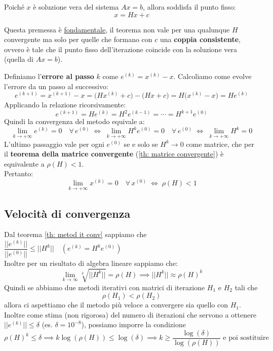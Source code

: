 \documentclass[12pt,a4paper,]{report}
\begin{document}
\begin{dimostrazione}
Poiché $x$ è soluzione vera del sistema $Ax=b$, allora soddisfa il punto fisso: 
\[
x = Hx + c
\]
\begin{nota}
    Questa premessa è \uline{fondamentale}, il teorema non vale per una qualunque $H$ convergente ma solo per quelle che formano con $c$ una \textbf{coppia consistente}, ovvero è tale che il punto fisso dell'iterazione coincide con la soluzione vera (quella di $Ax=b$).
\end{nota}
\noindent
Definiamo l'\textbf{errore al passo} $k$ come $e^{(k)} = x^{(k)} - x$.
Calcoliamo come evolve l'errore da un passo al successivo:
\[
    e^{(k+1)}
    = x^{(k+1)} - x
    = \bigl(Hx^{(k)} + c\bigr) - \bigl(Hx + c\bigr)
    = H\bigl(x^{(k)} - x\bigr)
    = H e^{(k)}
\]
Applicando la relazione ricorsivamente:
\[
    e^{(k+1)} = He^{(k)} = H^2 e^{(k-1)} = \cdots = H^{k+1} e^{(0)}
\]
Quindi la convergenza del metodo equivale a:
\[
    \lim_{k \to +\infty} e^{(k)} = 0 \quad \forall\, e^{(0)}
    \;\Longleftrightarrow\;
    \lim_{k \to +\infty} H^k e^{(0)} = 0 \quad \forall\, e^{(0)}
    \;\Longleftrightarrow\;
    \lim_{k \to +\infty} H^k = 0
\]
L'ultimo passaggio vale per ogni $e^{(0)}$ se e solo se $H^k \to 0$ come matrice,
che per il \textbf{teorema della matrice convergente} (\ref{th: matrice convergente}) è equivalente a $\rho(H) < 1$.
\\
Pertanto:
\[
    \lim_{k \to +\infty} x^{(k)} = 0 \quad \forall\, x^{(0)}
    \;\Longleftrightarrow\;
    \rho(H) < 1
\]
\end{dimostrazione}

\subsection{Velocità di convergenza}
Dal teorema \ref{th: metod it conv} sappiamo che $\dfrac{||e^{(k)}||}{||e^{(0)}||} \leq ||H^k|| \quad (e^{(k)} = H^k e^{(0)})$\\
Inoltre per un risultato di algebra lineare sappiamo che:
\[
\lim_{k \to \infty} \sqrt[k]{||H^k||} = \rho(H) \implies ||H^k|| \approx \rho(H)^k
\]
Quindi se abbiamo due metodi iterativi con matrici di iterazione $H_1$ e $H_2$ tali che $$\rho(H_1) < \rho(H_2)$$ allora ci aspettiamo che il metodo più veloce a convergere sia quello con $H_1$.\\
Inoltre come stima (non rigorosa) del numero di iterazioni che servono a ottenere $||e^{(k)}|| \leq \delta$ (es. $\delta = 10^{-8}$), possiamo imporre la condizione
\[
\rho(H)^k \leq \delta \implies k \log(\rho(H)) \leq \log(\delta) \implies k \geq \frac{\log(\delta)}{\log(\rho(H))} \text{ e poi sostituire}
\]
\end{document}
